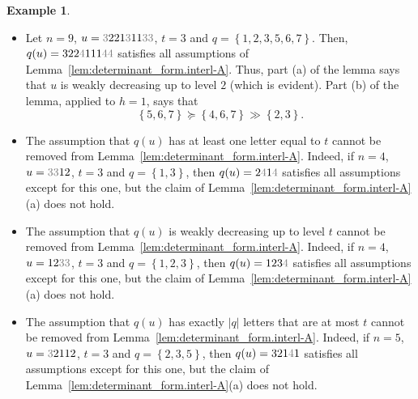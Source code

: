 \documentclass[reqno]{amsart}
\newcommand{\0}{\phantom{c}}
\newcommand{\set}[1]{\left\{ #1 \right\}}
\newcommand{\abs}[1]{\left| #1 \right|}
\theoremstyle{plain}
\theoremstyle{definition}
\newtheorem{example}[thm]{Example}
\numberwithin{equation}{section}
\begin{document}
\begin{example}
\mbox{}
\begin{itemize}
\item Let $n = 9$, $u = {\color{gray}3}221{\color{gray}3}11{\color{gray}33}$, $t = 3$ and $q = \set{1, 2, 3, 5, 6, 7}$.
Then, $q(u) = 322{\color{gray}4}111{\color{gray}44}$ satisfies all assumptions of
Lemma~\ref{lem:determinant_form.interl-A}.
Thus, part (a) of the lemma says that $u$ is weakly decreasing up to level $2$ (which is evident).
Part (b) of the lemma, applied to $h = 1$, says that
\[
\set{ 5, 6, 7 } \succeq \set{ 4, 6, 7 } \gg \set{ 2, 3 }.
\]

\item The assumption that $q(u)$ has at least one letter equal to $t$ cannot be removed from Lemma~\ref{lem:determinant_form.interl-A}.
Indeed, if $n = 4$, $u = {\color{gray}33}12$, $t = 3$ and $q = \set{1, 3}$, then $q(u) = 2{\color{gray}4}1{\color{gray}4}$ satisfies all assumptions except for this one, but the claim of Lemma~\ref{lem:determinant_form.interl-A}(a) does not hold.

\item The assumption that $q(u)$ is weakly decreasing up to level $t$ cannot be removed from Lemma~\ref{lem:determinant_form.interl-A}.
Indeed, if $n = 4$, $u = 12{\color{gray}33}$, $t = 3$ and $q = \set{1, 2, 3}$, then $q(u) = 123{\color{gray}4}$ satisfies all assumptions except for this one, but the claim of Lemma~\ref{lem:determinant_form.interl-A}(a) does not hold.

\item The assumption that $q(u)$ has exactly $\abs{q}$ letters that are at most $t$ cannot be removed from Lemma~\ref{lem:determinant_form.interl-A}.
Indeed, if $n = 5$, $u = {\color{gray}3}2112$, $t = 3$ and $q = \set{2, 3, 5}$, then $q(u) = 321{\color{gray}4}1$ satisfies all assumptions except for this one, but the claim of Lemma~\ref{lem:determinant_form.interl-A}(a) does not hold.
\end{itemize}
\end{example}
\end{document}
